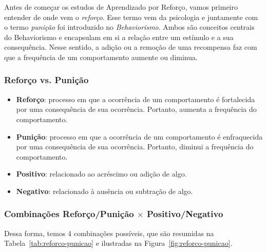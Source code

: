 \documentclass{article}
\begin{document}
            Antes de começar os estudos de Aprendizado por Reforço, vamos primeiro entender de onde vem o \emph{reforço}.
            Esse termo vem da psicologia e juntamente com o termo \emph{punição} foi introduzido no \emph{Behaviorismo}.
            Ambos são conceitos centrais do Behaviorismo e encapsulam em si a relação entre um estímulo e a sua consequência.
            Nesse sentido, a adição ou a remoção de uma recompensa faz com que a frequência de um comportamento aumente ou diminua.
        
            \subsubsection{Reforço vs. Punição}
            
                 \begin{itemize}
                     \item \textbf{Reforço}: processo em que a ocorrência de um comportamento é fortalecida por uma consequência de sua ocorrência. Portanto, aumenta a frequência do comportamento.
                     \item \textbf{Punição}: processo em que a ocorrência de um comportamento é enfraquecida por uma consequência de sua ocorrência. Portanto, diminui a frequência do comportamento.
                     \item \textbf{Positivo}: relacionado ao acréscimo ou adição de algo.
                     \item \textbf{Negativo}: relacionado à ausência ou subtração de algo.
                 \end{itemize}
                
            \subsubsection{Combinações Reforço/Punição \texorpdfstring{$\times$}{TEXT} Positivo/Negativo}
            
                Dessa forma, temos 4 combinações possíveis, que são resumidas na Tabela~\ref{tab:reforco-punicao} e ilustradas na Figura~\ref{fig:reforco-punicao}.
            
\end{document}
